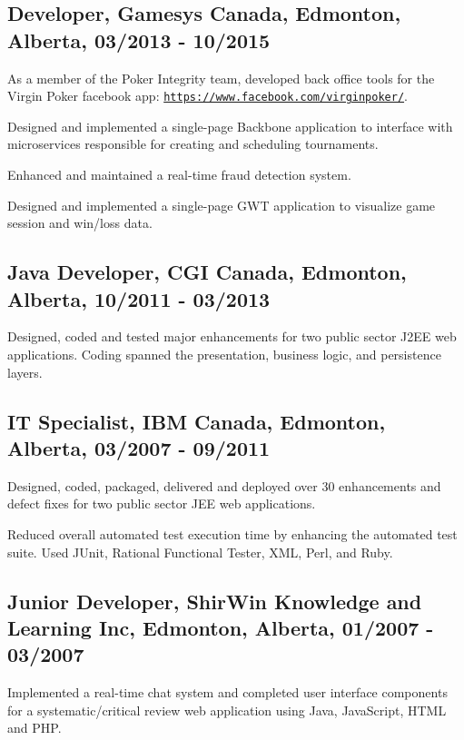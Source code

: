 \documentclass[10.5pt, letterpaper]{article}
\renewenvironment{itemize}{
  \begin{list}{}{
    \setlength{\leftmargin}{1.5em}
  }
}{
  \end{list}
}
\begin{document}
\subsection*{Developer, Gamesys Canada, Edmonton, Alberta, 03/2013 - 10/2015}
\begin{itemize}
    \item As a member of the Poker Integrity team, developed back office tools for the Virgin Poker facebook app: \href{https://www.facebook.com/virginpoker/}{\tt https://www.facebook.com/virginpoker/}.
\item Designed and implemented a single-page Backbone application to interface with microservices responsible for
creating and scheduling tournaments.
\item Enhanced and maintained a real-time fraud detection system.
\item Designed and implemented a single-page GWT application to visualize game session and win/loss data.
\end{itemize}

\subsection*{Java Developer, CGI Canada, Edmonton, Alberta, 10/2011 - 03/2013}
\begin{itemize}
\item Designed, coded and tested major enhancements for two public sector J2EE web applications.
Coding spanned the presentation, business logic, and persistence layers.
\end{itemize}

\subsection*{IT Specialist, IBM Canada, Edmonton, Alberta, 03/2007 - 09/2011}
\begin{itemize}
\item Designed, coded, packaged, delivered and deployed over 30 enhancements
and defect fixes for two public sector JEE web applications.
\item Reduced overall automated test execution time by enhancing the automated test suite.
Used JUnit, Rational Functional Tester, XML, Perl, and Ruby.
\end{itemize}

\subsection*{Junior Developer, ShirWin Knowledge and Learning Inc, Edmonton, Alberta, 01/2007 - 03/2007}
\begin{itemize}
\item Implemented a real-time chat system and completed user interface components for a systematic/critical review web application using Java, JavaScript, HTML and PHP.
\end{itemize}
\end{document}
